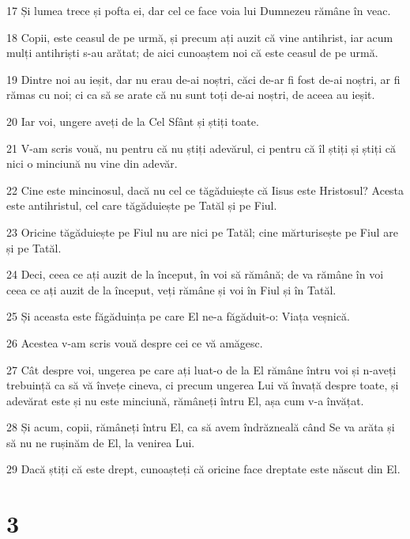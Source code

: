 \par 17 Și lumea trece și pofta ei, dar cel ce face voia lui Dumnezeu rămâne în veac.
\par 18 Copii, este ceasul de pe urmă, și precum ați auzit că vine antihrist, iar acum mulți antihriști s-au arătat; de aici cunoaștem noi că este ceasul de pe urmă.
\par 19 Dintre noi au ieșit, dar nu erau de-ai noștri, căci de-ar fi fost de-ai noștri, ar fi rămas cu noi; ci ca să se arate că nu sunt toți de-ai noștri, de aceea au ieșit.
\par 20 Iar voi, ungere aveți de la Cel Sfânt și știți toate.
\par 21 V-am scris vouă, nu pentru că nu știți adevărul, ci pentru că îl știți și știți că nici o minciună nu vine din adevăr.
\par 22 Cine este mincinosul, dacă nu cel ce tăgăduiește că Iisus este Hristosul? Acesta este antihristul, cel care tăgăduiește pe Tatăl și pe Fiul.
\par 23 Oricine tăgăduiește pe Fiul nu are nici pe Tatăl; cine mărturisește pe Fiul are și pe Tatăl.
\par 24 Deci, ceea ce ați auzit de la început, în voi să rămână; de va rămâne în voi ceea ce ați auzit de la început, veți rămâne și voi în Fiul și în Tatăl.
\par 25 Și aceasta este făgăduința pe care El ne-a făgăduit-o: Viața veșnică.
\par 26 Acestea v-am scris vouă despre cei ce vă amăgesc.
\par 27 Cât despre voi, ungerea pe care ați luat-o de la El rămâne întru voi și n-aveți trebuință ca să vă învețe cineva, ci precum ungerea Lui vă învață despre toate, și adevărat este și nu este minciună, rămâneți întru El, așa cum v-a învățat.
\par 28 Și acum, copii, rămâneți întru El, ca să avem îndrăzneală când Se va arăta și să nu ne rușinăm de El, la venirea Lui.
\par 29 Dacă știți că este drept, cunoașteți că oricine face dreptate este născut din El.

\chapter{3}

